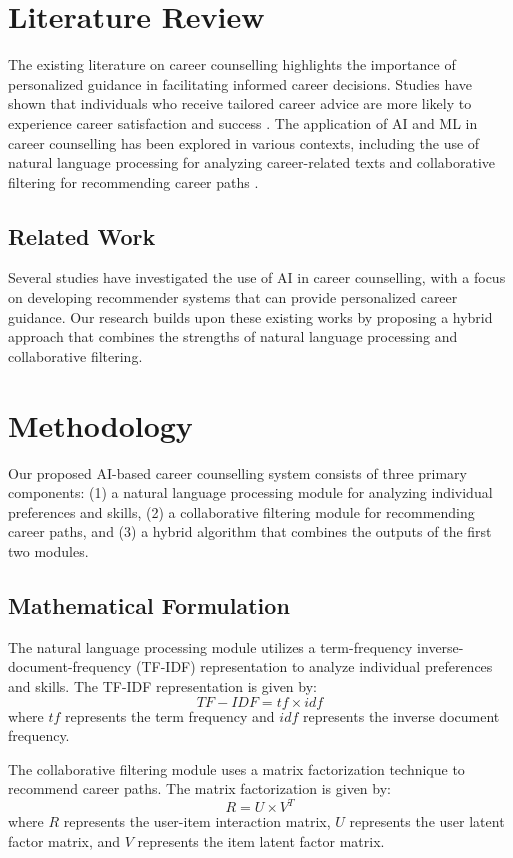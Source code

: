\documentclass[12pt,a4paper]{article}
\begin{document}
\section{Literature Review}
The existing literature on career counselling highlights the importance of personalized guidance in facilitating informed career decisions. Studies have shown that individuals who receive tailored career advice are more likely to experience career satisfaction and success \citep{key1}. The application of AI and ML in career counselling has been explored in various contexts, including the use of natural language processing for analyzing career-related texts \citep{key2} and collaborative filtering for recommending career paths \citep{key3}.

\subsection{Related Work}
Several studies have investigated the use of AI in career counselling, with a focus on developing recommender systems that can provide personalized career guidance. Our research builds upon these existing works by proposing a hybrid approach that combines the strengths of natural language processing and collaborative filtering.

\section{Methodology}
Our proposed AI-based career counselling system consists of three primary components: (1) a natural language processing module for analyzing individual preferences and skills, (2) a collaborative filtering module for recommending career paths, and (3) a hybrid algorithm that combines the outputs of the first two modules.

\subsection{Mathematical Formulation}
The natural language processing module utilizes a term-frequency inverse-document-frequency (TF-IDF) representation to analyze individual preferences and skills. The TF-IDF representation is given by:
\[ TF-IDF = tf \times idf \]
where $tf$ represents the term frequency and $idf$ represents the inverse document frequency.

The collaborative filtering module uses a matrix factorization technique to recommend career paths. The matrix factorization is given by:
\[ R = U \times V^T \]
where $R$ represents the user-item interaction matrix, $U$ represents the user latent factor matrix, and $V$ represents the item latent factor matrix.
\end{document}
